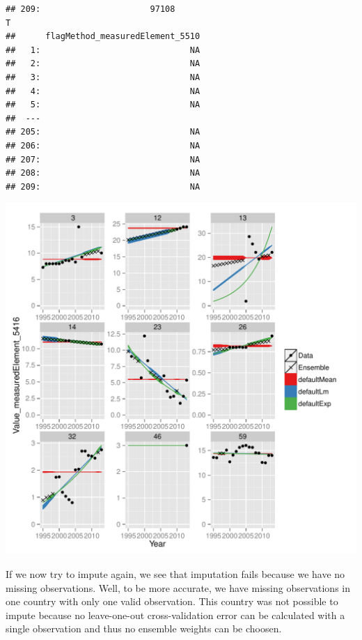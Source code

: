 \documentclass[nojss]{jss}
\begin{document}
\begin{knitrout}
\begin{kframe}
\begin{verbatim}
## 209:                      97108                                          T
##      flagMethod_measuredElement_5510
##   1:                              NA
##   2:                              NA
##   3:                              NA
##   4:                              NA
##   5:                              NA
##  ---                                
## 205:                              NA
## 206:                              NA
## 207:                              NA
## 208:                              NA
## 209:                              NA
\end{verbatim}
\end{kframe}

{\centering \includegraphics[width=\maxwidth]{figure/unnamed-chunk-4-1} 

}



\end{knitrout}

If we now try to impute again, we see that imputation fails because we have no
missing observations.  Well, to be more accurate, we have missing observations
in one country with only one valid observation.  This country was not
possible to impute because no leave-one-out cross-validation error can be
calculated with a single observation and thus no ensemble weights can be
choosen.
\end{document}
